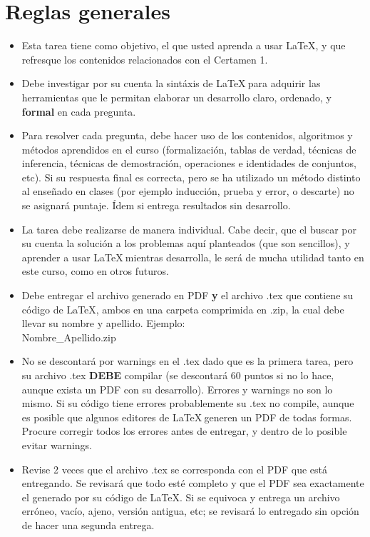 \documentclass[letterpaper,10pt]{article}
\begin{document}
\section{Reglas generales}
\begin{itemize}
    \item Esta tarea tiene como objetivo, el que usted aprenda a usar \LaTeX, y que refresque los contenidos relacionados con el Certamen 1. 
    \item Debe investigar por su cuenta la sintáxis de \LaTeX $~$para adquirir las herramientas que le permitan elaborar un desarrollo claro, ordenado, y \textbf{formal} en cada pregunta.
    
    \item Para resolver cada pregunta, debe hacer uso de los contenidos, algoritmos y métodos aprendidos en el curso (formalización, tablas de verdad, técnicas de inferencia, técnicas de demostración, operaciones e identidades de conjuntos, etc). Si su respuesta final es correcta, pero se ha utilizado un método distinto al enseñado en clases (por ejemplo inducción, prueba y error, o descarte) no se asignará puntaje. Ídem si entrega resultados sin desarrollo.
    
    \item La tarea debe realizarse de manera individual. Cabe decir, que el buscar por su cuenta la solución a los problemas aquí planteados (que son sencillos), y aprender a usar \LaTeX  $~$mientras desarrolla, le será de mucha utilidad tanto en este curso, como en otros futuros.
    
    \item Debe entregar el archivo generado en PDF \textbf{y} el archivo .tex que contiene su código de \LaTeX, ambos en una carpeta comprimida en .zip, la cual debe llevar su nombre y apellido. Ejemplo:\\ Nombre\_Apellido.zip
    
    \item No se descontará por warnings en el .tex dado que es la primera tarea, pero su archivo .tex \textbf{DEBE} compilar (se descontará 60 puntos si no lo hace, aunque exista un PDF con su desarrollo). Errores y warnings no son lo mismo. Si su código tiene errores probablemente su .tex no compile, aunque es posible que algunos editores de \LaTeX $~$generen un PDF de todas formas. Procure corregir todos los errores antes de entregar, y dentro de lo posible evitar warnings.
    
    \item Revise 2 veces que el archivo .tex se corresponda con el PDF que está entregando. Se revisará que todo esté completo y que el PDF sea exactamente el generado por su código de \LaTeX . Si se equivoca y entrega un archivo erróneo, vacío, ajeno, versión antigua, etc; se revisará lo entregado sin opción de hacer una segunda entrega.
    

\end{itemize}
\end{document}
